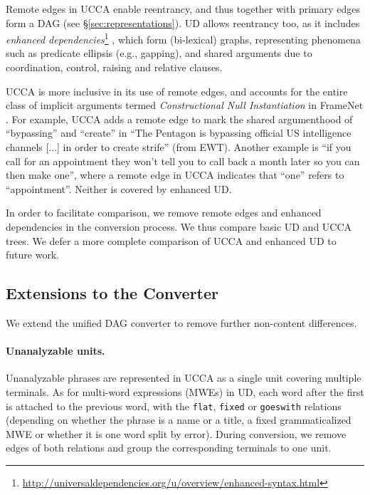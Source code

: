 \documentclass[11pt,a4paper]{article}
\begin{document}
Remote edges in UCCA enable reentrancy, and thus together with primary edges form a DAG (see \S\ref{sec:representations}).
UD allows reentrancy too, as it includes \textit{enhanced dependencies}\footnote{\url{http://universaldependencies.org/u/overview/enhanced-syntax.html}}
\cite{SCHUSTER16.779}, which form (bi-lexical) graphs, representing phenomena
such as predicate ellipsis (e.g., gapping),
and shared arguments due to coordination, control, raising and relative clauses.

UCCA is more inclusive in its use of remote edges, and accounts for 
the entire class of implicit arguments termed {\it Constructional Null Instantiation} in FrameNet \citep{Ruppenhofer:16}.
For example, UCCA adds a remote edge to mark the shared argumenthood of ``bypassing'' and
``create'' in ``The Pentagon is bypassing official US intelligence channels [...] in order to create strife'' (from EWT). 
Another example is ``if you call for an appointment they won't tell you to call back a month later so you can then make one'',
where a remote edge in UCCA indicates that ``one'' refers to ``appointment''.
Neither is covered by enhanced UD.

In order to facilitate comparison, we remove remote edges and enhanced dependencies in the conversion process.
We thus compare basic UD and UCCA trees. We defer a more complete comparison of UCCA and enhanced UD to future work.



\subsection{Extensions to the Converter}\label{sec:local}

We extend the unified DAG converter to remove further non-content differences.

\paragraph{Unanalyzable units.}
Unanalyzable phrases are represented in UCCA as a single unit covering multiple terminals.
As for multi-word expressions (MWEs) in UD, each word after the first is attached to the previous word,
with the \texttt{flat}, \texttt{fixed} or \texttt{goeswith} relations
(depending on whether the phrase is a name or a title, a fixed grammaticalized MWE
or whether it is one word split by error).
During conversion, we remove edges of both relations and group the corresponding terminals to one unit.
\end{document}
